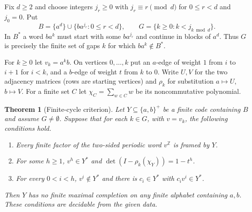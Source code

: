 \documentclass[11pt,a4paper]{article}
\newtheorem{theorem}{Theorem}
\newcommand{\Z}{\mathbb{Z}}
\begin{document}
Fix $d\ge2$ and choose integers $j_r\ge0$ with $j_r\equiv r\pmod d$ for $0\le r<d$ and $j_0=0$.
Put
\[
  B=\{a^d\}\cup\{ba^{j_r}: 0\le r<d\},\qquad G=\{k\ge0: k<j_{k\bmod d}\}.
\]
In $B^*$ a word $ba^k$ must start with some $ba^{j_r}$ and continue in blocks of $a^d$. Thus $G$ is
precisely the finite set of gaps $k$ for which $ba^k\notin B^*$.

For $k\ge0$ let $v_k=a^kb$. On vertices $0,\dots,k$ put an $a$-edge of weight $1$ from $i$ to
$i+1$ for $i<k$, and a $b$-edge of weight $t$ from $k$ to $0$. Write $U,V$ for the two adjacency
matrices (rows are starting vertices) and $\rho_k$ for substitution $a\mapsto U$, $b\mapsto V$. For
a finite set $C$ let $\chi_C=\sum_{w\in C}w$ be its noncommutative polynomial.

\begin{theorem}[Finite-cycle criterion]\label{thm:criterion}
Let $Y\subseteq\{a,b\}^+$ be a finite code containing $B$ and assume $G\ne\emptyset$. Suppose
that for each $k\in G$, with $v=v_k$, the following conditions hold.
\begin{enumerate}
  \item[(i)] Every finite factor of the two-sided periodic word $v^{\Z}$ is framed by $Y$.
  \item[(ii)] For some $h\ge1$, $v^h\in Y^*$ and $\det(I-\rho_k(\chi_Y))=1-t^h$.
  \item[(iii)] For every $0<i<h$, $v^i\notin Y^*$ and there is $c_i\in Y^*$ with $c_iv^i\in Y^*$.
\end{enumerate}
Then $Y$ has no finite maximal completion on any finite alphabet containing $a,b$. These
conditions are decidable from the given data.
\end{theorem}
\end{document}
